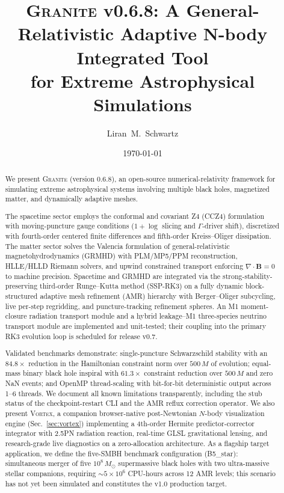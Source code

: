 \documentclass[aps,prd,twocolumn,superscriptaddress,nofootinbib,showpacs,
               longbibliography]{revtex4-2}
\newcommand{\granite}{\textsc{Granite}}
\newcommand{\Msun}{M_\odot}
\begin{document}
\title{%
  \granite{} v0.6.8: A General-Relativistic Adaptive N-body Integrated Tool\\
  for Extreme Astrophysical Simulations%
}

\author{Liran~M.~Schwartz}



\date{\today}

\begin{abstract}
We present \granite{} (version 0.6.8), an open-source numerical-relativity
framework for simulating extreme astrophysical systems involving multiple
black holes, magnetized matter, and dynamically adaptive meshes.

The spacetime sector employs the conformal and covariant Z4 (CCZ4)
formulation~\cite{Alic2012} with moving-puncture gauge conditions
($1+\log$ slicing and $\Gamma$-driver shift), discretized with
fourth-order centered finite differences and fifth-order Kreiss--Oliger
dissipation.
The matter sector solves the Valencia formulation of general-relativistic
magnetohydrodynamics (GRMHD) with PLM/MP5/PPM reconstruction, HLLE/HLLD
Riemann solvers, and upwind constrained transport enforcing $\nabla\cdot
\mathbf{B}=0$ to machine precision.
Spacetime and GRMHD are integrated via the strong-stability-preserving
third-order Runge--Kutta method (SSP-RK3) on a fully dynamic block-structured
adaptive mesh refinement (AMR) hierarchy with Berger--Oliger subcycling,
live per-step regridding, and puncture-tracking refinement spheres.
An M1 moment-closure radiation transport module and a hybrid leakage--M1
three-species neutrino transport module are implemented and unit-tested;
their coupling into the primary RK3 evolution loop is scheduled for
release v0.7.

Validated benchmarks demonstrate: single-puncture Schwarzschild stability
with an $84.8\times$ reduction in the Hamiltonian constraint norm over
$500\,M$ of evolution; equal-mass binary black hole inspiral with
$61.3\times$ constraint reduction over $500\,M$ and zero NaN events; and
OpenMP thread-scaling with bit-for-bit deterministic output across 1--6
threads.
We document all known limitations transparently, including the stub status
of the checkpoint-restart CLI and the AMR reflux correction operator.
We also present \textsc{Vortex}, a companion browser-native post-Newtonian
$N$-body visualization engine (Sec.~\ref{sec:vortex}) implementing a
4th-order Hermite predictor-corrector integrator with 2.5PN radiation
reaction, real-time GLSL gravitational lensing, and research-grade
live diagnostics on a zero-allocation architecture.
As a flagship target application, we define the five-SMBH benchmark
configuration (B5\_star): simultaneous merger of five $10^8\,\Msun$
supermassive black holes with two ultra-massive stellar companions, requiring
${\sim}5\times10^6$ CPU-hours across 12 AMR levels; this scenario has not yet
been simulated and constitutes the v1.0 production target.


\end{abstract}
\end{document}
